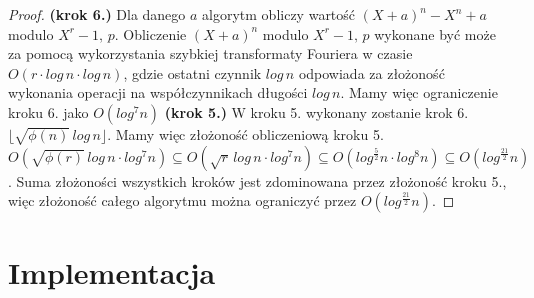 \documentclass[declaration,shortabstract]{iithesis}
\theoremstyle{definition}
\theoremstyle{remark} \newtheorem{observation}{Obserwacja}
\theoremstyle{plain} \newtheorem{theorem}{Twierdzenie}
\theoremstyle{plain} \newtheorem{lemma}{Lemat}
\theoremstyle{remark} \newtheorem*{remark*}{Uwaga}
\theoremstyle{reminder} \newtheorem*{reminder*}{Przypomnienie}
\begin{document}
\begin{proof}
	\textbf{(krok 6.)} Dla danego $a$ algorytm obliczy wartość $(X + a)^n - X^n + a$ modulo $X^r - 1, \, p$. Obliczenie $(X + a)^n$ modulo $X^r - 1, \, p$ wykonane być może za pomocą wykorzystania szybkiej transformaty Fouriera w czasie $O(r \cdot log \, n \cdot log \, n)$, gdzie ostatni czynnik $log \, n$ odpowiada za złożoność wykonania operacji na współczynnikach długości $log \, n$. Mamy więc ograniczenie kroku 6. jako $O(log^7n)$
	\textbf{(krok 5.)} W kroku 5. wykonany zostanie krok 6. $\lfloor \sqrt{\phi(n)} \, log \, n \rfloor$. Mamy więc złożoność obliczeniową kroku 5. $O(\sqrt{\phi(r)} \, log \, n \cdot log^7n) \subseteq O(\sqrt{r} \, log \, n \cdot log^7n) \subseteq O(log^{\frac{5}{2}}n \cdot log^8n) \subseteq O(log^{\frac{21}{2}}n)$.\newline
	\newline
	Suma złożoności wszystkich kroków jest zdominowana przez złożoność kroku 5., więc złożoność całego algorytmu można ograniczyć przez $O(log^{\frac{21}{2}}n)$.
					
					
\end{proof}
	
\chapter{Implementacja}
	

\end{document}
